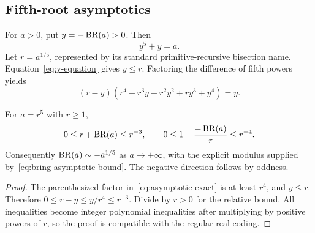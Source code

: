 \subsection{Fifth-root asymptotics}

For \(a>0\), put \(y=-\operatorname{BR}(a)>0\).  Then
\begin{equation}\label{eq:y-equation}
 y^5+y=a.
\end{equation}
Let \(r=a^{1/5}\), represented by its standard primitive-recursive bisection
name.  Equation~\eqref{eq:y-equation} gives \(y\le r\).  Factoring the
difference of fifth powers yields
\begin{equation}\label{eq:asymptotic-exact}
 (r-y)(r^4+r^3y+r^2y^2+ry^3+y^4)=y.
\end{equation}

\begin{theorem}\label{thm:bring-asymptotic}
For \(a=r^5\) with \(r\ge1\),
\begin{equation}\label{eq:bring-asymptotic-bound}
 0\le r+\operatorname{BR}(a)\le r^{-3},
 \qquad
 0\le 1-\frac{-\operatorname{BR}(a)}{r}\le r^{-4}.
\end{equation}
Consequently \(\operatorname{BR}(a)\sim-a^{1/5}\) as \(a\to+\infty\), with the explicit
modulus supplied by~\eqref{eq:bring-asymptotic-bound}.  The negative direction
follows by oddness.
\end{theorem}

\begin{proof}
The parenthesized factor in~\eqref{eq:asymptotic-exact} is at least \(r^4\),
and \(y\le r\).  Therefore
\(0\le r-y\le y/r^4\le r^{-3}\).  Divide by \(r>0\) for the relative bound.
All inequalities become integer polynomial inequalities after multiplying by
positive powers of \(r\), so the proof is compatible with the regular-real
coding.
\end{proof}

